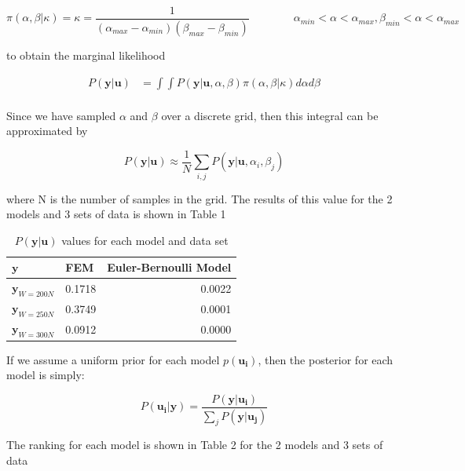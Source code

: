 \documentclass{article}
\begin{document}
\begin{equation}
\pi(\alpha, \beta|\kappa) = \kappa = \frac{1}{(\alpha_{max}- \alpha_{min})(\beta_{max}-\beta_{min})} \qquad \qquad \alpha_{min} < \alpha < \alpha_{max}, \beta_{min} < \alpha < \alpha_{max}
\end{equation}

to obtain the marginal likelihood

\begin{equation}
\begin{split}
P(\boldsymbol{y}|\boldsymbol{u}) & =\int{\int{P(\boldsymbol{y}|\boldsymbol{u},\alpha,\beta)\pi(\alpha,\beta| \kappa)}d\alpha} d\beta\\
\end{split}
\end{equation}

Since we have sampled $\alpha$ and $\beta$ over a discrete grid, then this integral can be approximated by

\begin{equation}
P(\boldsymbol{y}|\boldsymbol{u}) \approx\frac{1}{N}\sum_{i,j}{P(\boldsymbol{y}|\boldsymbol{u},\alpha_i,\beta_j)}
\end{equation}

where N is the number of samples in the grid.
The results of this value for the 2 models and 3 sets of data is shown in Table 1
\begin{table}[H]
	\centering
	\begin{tabular}{llr}  
		\toprule
		$\boldsymbol{y}$& FEM & Euler-Bernoulli Model \\
		\midrule
		$\boldsymbol{y}_{W = 200N}$ & 0.1718 & 0.0022\\
		$\boldsymbol{y}_{W = 250N}$ & 0.3749& 0.0001\\
		$\boldsymbol{y}_{W = 300N}$ & 0.0912& 0.0000\\
		\bottomrule
	\end{tabular}
\caption{$P(\boldsymbol{y}|\boldsymbol{u})$ values for each model and data set}
\end{table}

If we assume a uniform prior for each model $p(\boldsymbol{u_i})$, then the posterior for each model is simply:

\begin{equation}
P(\boldsymbol{u_i}|\boldsymbol{y}) = \frac{P(\boldsymbol{y}|\boldsymbol{u_i})}{\sum_j P(\boldsymbol{y}|\boldsymbol{u_j})}
\end{equation}

The ranking for each model is shown in Table 2 for the 2 models and 3 sets of data
\end{document}

